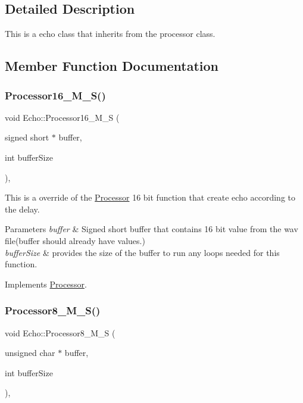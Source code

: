 \subsection{Detailed Description}
This is a echo class that inherits from the processor class. 

\subsection{Member Function Documentation}
\mbox{\label{classEcho_ad68f1fabcbac2646c70aded5904b3a2c}} 
\subsubsection{\texorpdfstring{Processor16\+\_\+\+M\+\_\+\+S()}{Processor16\_M\_S()}}
{\footnotesize\ttfamily void Echo\+::\+Processor16\+\_\+\+M\+\_\+S (\begin{DoxyParamCaption}\item[{signed short $\ast$}]{buffer,  }\item[{int}]{buffer\+Size }\end{DoxyParamCaption})\hspace{0.3cm}{\ttfamily [override]}, {\ttfamily [virtual]}}



This is a override of the \hyperlink{classProcessor}{Processor} 16 bit function that create echo according to the delay. 


\begin{DoxyParams}{Parameters}
{\em buffer} & Signed short buffer that contains 16 bit value from the wav file(buffer should already have values.) \\
\hline
{\em buffer\+Size} & provides the size of the buffer to run any loops needed for this function. \\
\hline
\end{DoxyParams}


Implements \hyperlink{classProcessor}{Processor}.

\mbox{\label{classEcho_af4337545ebf5602337e605376bfa8dc3}} 
\subsubsection{\texorpdfstring{Processor8\+\_\+\+M\+\_\+\+S()}{Processor8\_M\_S()}}
{\footnotesize\ttfamily void Echo\+::\+Processor8\+\_\+\+M\+\_\+S (\begin{DoxyParamCaption}\item[{unsigned char $\ast$}]{buffer,  }\item[{int}]{buffer\+Size }\end{DoxyParamCaption})\hspace{0.3cm}{\ttfamily [override]}, {\ttfamily [virtual]}}



